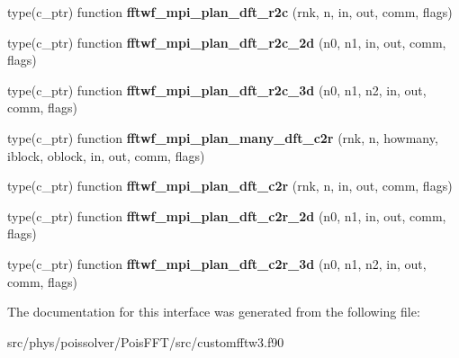 \begin{DoxyCompactItemize}
\item 
type(c\+\_\+ptr) function {\bfseries fftwf\+\_\+mpi\+\_\+plan\+\_\+dft\+\_\+r2c} (rnk, n, in, out, comm, flags)\hypertarget{interfacefftw3_1_1fftw__mpi__plan__gen_acc5e5482d142e80fdb8e3c1e1986b13c}{}\label{interfacefftw3_1_1fftw__mpi__plan__gen_acc5e5482d142e80fdb8e3c1e1986b13c}

\item 
type(c\+\_\+ptr) function {\bfseries fftwf\+\_\+mpi\+\_\+plan\+\_\+dft\+\_\+r2c\+\_\+2d} (n0, n1, in, out, comm, flags)\hypertarget{interfacefftw3_1_1fftw__mpi__plan__gen_a36beef6f880e99db550e62012cbc66c0}{}\label{interfacefftw3_1_1fftw__mpi__plan__gen_a36beef6f880e99db550e62012cbc66c0}

\item 
type(c\+\_\+ptr) function {\bfseries fftwf\+\_\+mpi\+\_\+plan\+\_\+dft\+\_\+r2c\+\_\+3d} (n0, n1, n2, in, out, comm, flags)\hypertarget{interfacefftw3_1_1fftw__mpi__plan__gen_aff0129dbd0fcb6e3f7cb6f3c9b93e1aa}{}\label{interfacefftw3_1_1fftw__mpi__plan__gen_aff0129dbd0fcb6e3f7cb6f3c9b93e1aa}

\item 
type(c\+\_\+ptr) function {\bfseries fftwf\+\_\+mpi\+\_\+plan\+\_\+many\+\_\+dft\+\_\+c2r} (rnk, n, howmany, iblock, oblock, in, out, comm, flags)\hypertarget{interfacefftw3_1_1fftw__mpi__plan__gen_ab8661f2c21ca549b2a77dced1187bafb}{}\label{interfacefftw3_1_1fftw__mpi__plan__gen_ab8661f2c21ca549b2a77dced1187bafb}

\item 
type(c\+\_\+ptr) function {\bfseries fftwf\+\_\+mpi\+\_\+plan\+\_\+dft\+\_\+c2r} (rnk, n, in, out, comm, flags)\hypertarget{interfacefftw3_1_1fftw__mpi__plan__gen_af3e7d59a2a2055cc346bd9f0e9ca4a30}{}\label{interfacefftw3_1_1fftw__mpi__plan__gen_af3e7d59a2a2055cc346bd9f0e9ca4a30}

\item 
type(c\+\_\+ptr) function {\bfseries fftwf\+\_\+mpi\+\_\+plan\+\_\+dft\+\_\+c2r\+\_\+2d} (n0, n1, in, out, comm, flags)\hypertarget{interfacefftw3_1_1fftw__mpi__plan__gen_a5e3d4dc6dfe88352def3f9bb0148067e}{}\label{interfacefftw3_1_1fftw__mpi__plan__gen_a5e3d4dc6dfe88352def3f9bb0148067e}

\item 
type(c\+\_\+ptr) function {\bfseries fftwf\+\_\+mpi\+\_\+plan\+\_\+dft\+\_\+c2r\+\_\+3d} (n0, n1, n2, in, out, comm, flags)\hypertarget{interfacefftw3_1_1fftw__mpi__plan__gen_a9e109255ea9819221af247e140107b4f}{}\label{interfacefftw3_1_1fftw__mpi__plan__gen_a9e109255ea9819221af247e140107b4f}

\end{DoxyCompactItemize}


The documentation for this interface was generated from the following file\+:\begin{DoxyCompactItemize}
\item 
src/phys/poissolver/\+Pois\+F\+F\+T/src/customfftw3.\+f90\end{DoxyCompactItemize}
